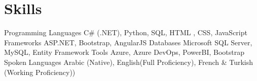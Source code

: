 
\section{Skills}
\sectionStart
  \skillItem
    {Programming Languages}
    {C\# (.NET), Python, SQL, HTML , CSS, JavaScript}
  \skillItem
    {Frameworks}
    {ASP.NET, Bootstrap, AngularJS}
  \skillItem
  {Databases}
  {Microsoft SQL Server, MySQL, Entity Framework}
  \skillItem
    {Tools}
    {Azure, Azure DevOps, PowerBI, Bootstrap}
     \skillItem
    {Spoken Languages}
    {Arabic (Native), English(Full Proficiency), French \& Turkish (Working Proficiency))}
  \vspace{3pt}
\sectionEnd